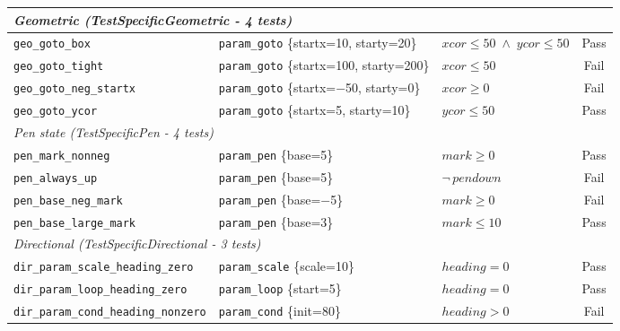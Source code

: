 {\begin{longtable}{p{} p{} p{} c}
\midrule
\multicolumn{4}{l}{\textit{Geometric (TestSpecificGeometric - 4 tests)}} \\
\midrule
\texttt{geo\_goto\_box}                    & \texttt{param\_goto} \newline \{startx=10, starty=20\} & $\mathit{xcor} \leq 50 \;\wedge\; \mathit{ycor} \leq 50$ & Pass \\
\texttt{geo\_goto\_tight}                  & \texttt{param\_goto} \newline \{startx=100, starty=200\} & $\mathit{xcor} \leq 50$ & Fail \\
\texttt{geo\_goto\_neg\_startx}            & \texttt{param\_goto} \newline \{startx=$-$50, starty=0\} & $\mathit{xcor} \geq 0$ & Fail \\
\texttt{geo\_goto\_ycor}                   & \texttt{param\_goto} \newline \{startx=5, starty=10\} & $\mathit{ycor} \leq 50$ & Pass \\

\midrule
\multicolumn{4}{l}{\textit{Pen state (TestSpecificPen - 4 tests)}} \\
\midrule
\texttt{pen\_mark\_nonneg}                 & \texttt{param\_pen} \newline \{base=5\}    & $\mathit{mark} \geq 0$  & Pass \\
\texttt{pen\_always\_up}                   & \texttt{param\_pen} \newline \{base=5\}    & $\neg\,\mathit{pendown}$& Fail \\
\texttt{pen\_base\_neg\_mark}              & \texttt{param\_pen} \newline \{base=$-$5\} & $\mathit{mark} \geq 0$  & Fail \\
\texttt{pen\_base\_large\_mark}            & \texttt{param\_pen} \newline \{base=3\}    & $\mathit{mark} \leq 10$ & Pass \\

\midrule
\multicolumn{4}{l}{\textit{Directional (TestSpecificDirectional - 3 tests)}} \\
\midrule
\texttt{dir\_param\_scale\_heading\_zero}  & \texttt{param\_scale} \newline \{scale=10\} & $\mathit{heading} = 0$ & Pass \\
\texttt{dir\_param\_loop\_heading\_zero}   & \texttt{param\_loop} \newline \{start=5\}   & $\mathit{heading} = 0$ & Pass \\
\texttt{dir\_param\_cond\_heading\_nonzero} & \texttt{param\_cond} \newline \{init=80\}  & $\mathit{heading} > 0$ & Fail \\

\end{longtable}
}

